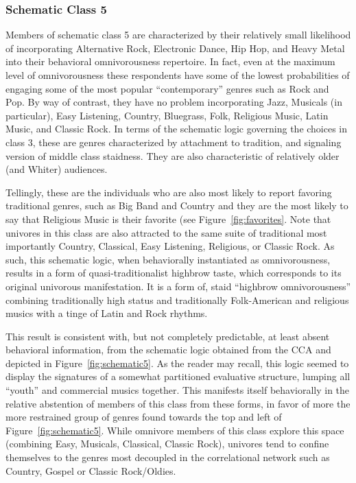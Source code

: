 \documentclass[preprint,12pt]{elsarticle}
\begin{document}
\subsubsection{Schematic Class 5}
Members of schematic class 5 are characterized by their relatively small likelihood of incorporating Alternative Rock, Electronic Dance, Hip Hop, and Heavy Metal into their behavioral omnivorousness repertoire. In fact, even at the maximum level of omnivorousness these respondents have some of the lowest probabilities of engaging some of the most popular ``contemporary'' genres such as Rock and Pop. By way of contrast, they have no problem incorporating Jazz, Musicals (in particular), Easy Listening, Country, Bluegrass, Folk, Religious Music, Latin Music, and Classic Rock. In terms of the schematic logic governing the choices in class 3, these are genres characterized by attachment to tradition, and signaling version of middle class staidness. They are also characteristic of relatively older (and Whiter) audiences. 

Tellingly, these are the individuals who are also most likely to report favoring traditional genres, such as Big Band and Country and they are the most likely to say that Religious Music is their favorite (see Figure~\ref{fig:favorites}. Note that univores in this class are also attracted to the same suite of traditional most importantly Country, Classical, Easy Listening, Religious, or Classic Rock. As such, this schematic logic, when behaviorally instantiated as omnivorousness, results in a form of quasi-traditionalist highbrow taste, which corresponds to its original univorous manifestation. It is a form of, staid ``highbrow omnivorousness'' combining traditionally high status and traditionally Folk-American and religious musics with a tinge of Latin and Rock rhythms. 

This result is consistent with, but not completely predictable, at least absent behavioral information, from the schematic logic obtained from the CCA and depicted in Figure~\ref{fig:schematic5}. As the reader may recall, this logic seemed to display the signatures of a somewhat partitioned evaluative structure, lumping all ``youth'' and commercial musics together. This manifests itself behaviorally in the relative abstention of members of this class from these forms, in favor of more the more restrained group of genres found towards the top and left of Figure~\ref{fig:schematic5}. While omnivore members of this class explore this space (combining Easy, Musicals, Classical, Classic Rock), univores tend to confine themselves to the genres most decoupled in the correlational network such as Country, Gospel or Classic Rock/Oldies. 
\end{document}
